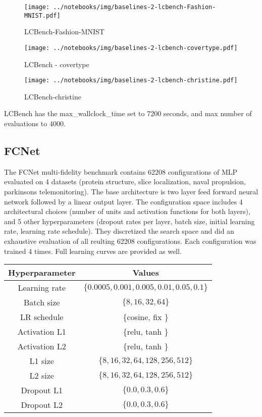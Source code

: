 \begin{figure}[H]
    \centering
    \texttt{[image: ../notebooks/img/baselines-2-lcbench-Fashion-MNIST.pdf]}
    \caption{LCBench-Fashion-MNIST}
\end{figure}

\begin{figure}[H]
    \centering
    \texttt{[image: ../notebooks/img/baselines-2-lcbench-covertype.pdf]}
    \caption{LCBench - covertype}
\end{figure}

\begin{figure}[H]
    \centering
    \texttt{[image: ../notebooks/img/baselines-2-lcbench-christine.pdf]}
    \caption{LCBench-christine}
\end{figure}

LCBench has the max\_wallclock\_time set to 7200 seconds, and max number of evaluations to 4000.

\subsection{FCNet}
The FCNet multi-fidelity benchmark contains 62208 configurations of MLP evaluated on 4 datasets (protein structure, slice localization, naval propulsion, parkinsons telemonitoring). The base architecture is two layer feed forward neural network followed by a linear output layer. The configuration space includes 4 architectural choices (number of units and activation functions for both layers), and 5 other hyperparameters (dropout rates per layer, batch size, initial learning rate, learning rate schedule). They discretized the search space and did an exhaustive evaluation of all reulting 62208 configurations. Each configuration was trained 4 times. Full learning curves are provided as well.

\begin{table}
    \centering
\begin{tabular}{cc}
    \textbf{Hyperparameter} & \textbf{Values} \\ \midrule
    Learning rate & $\{0.0005, 0.001, 0.005, 0.01, 0.05, 0.1\}$ \\
    Batch size & $\{8, 16, 32, 64\}$ \\
    LR schedule & $\{$cosine, fix $\}$ \\
    Activation L1 & $\{$relu, tanh $\}$ \\
    Activation L2 & $\{$relu, tanh $\}$ \\
    L1 size & $\{8, 16, 32, 64, 128, 256, 512\}$ \\
    L2 size & $\{8, 16, 32, 64, 128, 256, 512\}$ \\
    Dropout L1 & $\{0.0, 0.3, 0.6\}$ \\
    Dropout L2 & $\{0.0, 0.3, 0.6\}$
    \end{tabular}
\end{table}


